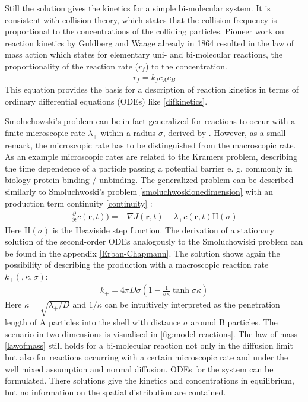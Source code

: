 \documentclass[
  a4paper,BCOR10mm,oneside,
  headsepline,footsepline,%
  fleqn,openbib
]{scrbook}
\begin{document}
Still the solution gives the kinetics for a simple bi-molecular system. It is consistent with collision theory, which states that the collision frequency is proportional to the concentrations of the colliding particles. Pioneer work on reaction kinetics by Guldberg and Waage already in 1864 \cite{Waage1986} resulted in the law of mass action which states for elementary uni- and bi-molecular reactions, the proportionality of the reaction rate ($r_f$) to the concentration.
\begin{align} \label{lawofmass}
 r_f=k_f c_A c_B
\end{align}
This equation provides the basis for a description of reaction kinetics in terms of ordinary differential equations (ODEs) like \cref{difkinetics}.\par
Smoluchowski's problem can be in fact generalized for reactions to occur with a finite microscopic rate $\lambda_{+}$ within a radius $\sigma$, derived by \citet{Erban2009}.  However, as a small remark, the microscopic rate has to be distinguished from the macroscopic rate. As an example microscopic rates are related to the Kramers problem, describing the time dependence of a particle passing a potential barrier e. g. commonly in biology protein binding / unbinding. The generalized problem can be described similarly to Smoluchwoski's problem \cref{smoluchwoskionedimension}  with an production term  continuity  \cref{continuity} :
\begin{align}
\frac{\partial}{\partial t} c(\bm{r},t))=- \nabla J(\bm{r},t)- \lambda_+ c(\bm{r},t) \mathrm{H}(\sigma)
\end{align}
Here $\mathrm{H}(\sigma)$ is the Heaviside step function. The derivation of a  stationary solution of the second-order ODEs analogously to  the Smoluchowiski problem can be found in the appendix \ref{Erban-Chapmann}. The solution shows again the possibility of describing the production with a macroscopic reaction rate $k_{+}(,\kappa, \sigma)$:
\begin{align} \label{kalphaerbanchepmann}
k_{+}=4 \pi D \sigma \left( 1-\frac{1}{\sigma \kappa} \tanh{\sigma \kappa}\right)
\end{align}
Here $\kappa=\sqrt{\lambda_+/D}$ and $1/\kappa$ can be intuitively interpreted as the penetration length of A particles into the shell with distance $\sigma$ around B particles. The scenario in two dimensions is visualised in \cref{fig:model-reactions}. The law of mass \cref{lawofmass}  still holds for a bi-molecular reaction not only in the diffusion limit but also for reactions occurring with a certain microscopic rate and under the well mixed assumption and normal diffusion.  ODEs for the system can be formulated. There solutions give the kinetics and concentrations in equilibrium, but no information on the spatial distribution are contained.
\end{document}
